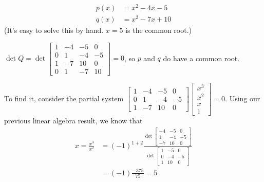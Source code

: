 \begin{numerical-example}
  \begin{align*}
    p(x) &= x^2 - 4x - 5 \\
    q(x) &= x^2 - 7x + 10
  \end{align*}
  (It's easy to solve this by hand. $x = 5$ is the common root.)

  $\det Q = \det
  \begin{bmatrix}
    1 & -4 & -5 & 0 \\
    0 & 1 & -4 & -5 \\
    1 & -7 & 10 & 0 \\
    0 & 1 & -7 & 10
  \end{bmatrix} = 0
  $, so $p$ and $q$ do have a common root.

  To find it, consider the partial system $
  \begin{bmatrix}
    1 & -4 & -5 & 0 \\
    0 & 1 & -4 & -5 \\
    1 & -7 & 10 & 0
  \end{bmatrix}
  \begin{bmatrix}
    x^3 \\ x^2 \\ x \\ 1
  \end{bmatrix} = 0
  $. Using our previous linear algebra result, we know that
  \begin{align*}
    x = \frac{x^3}{x^2} &= (-1)^{1+2} \frac{\det
    \begin{bmatrix}
      -4 & -5 & 0 \\
      1 & -4 & -5 \\
      -7 & 10 & 0
    \end{bmatrix}
}{\det
                \begin{bmatrix}
                  1 & -5 & 0 \\
                  0 & -4 & -5 \\
                  1 & 10 & 0
                \end{bmatrix}
                           } \\
    &= (-1) \frac{-375}{75} = 5
  \end{align*}
\end{numerical-example}

